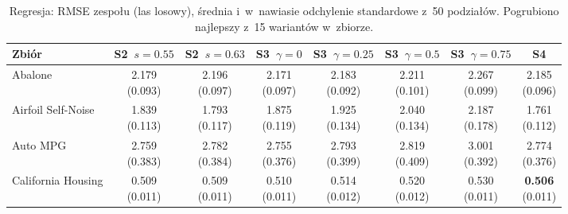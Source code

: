 {\scriptsize\setlength{\tabcolsep}{1.5pt}
\begin{longtable}{lccccccc}
\caption{Regresja: RMSE zespołu (las losowy), średnia i~w~nawiasie odchylenie standardowe z~50 podziałów. Pogrubiono najlepszy z~15 wariantów w~zbiorze.}\\
\toprule
\textbf{Zbiór} & S2~$s=0.55$ & S2~$s=0.63$ & S3~$\gamma=0$ & S3~$\gamma=0.25$ & S3~$\gamma=0.5$ & S3~$\gamma=0.75$ & S4 \\
\midrule
\endhead
Abalone & \makecell{2.179\\{\tiny (0.093)}} & \makecell{2.196\\{\tiny (0.097)}} & \makecell{2.171\\{\tiny (0.097)}} & \makecell{2.183\\{\tiny (0.092)}} & \makecell{2.211\\{\tiny (0.101)}} & \makecell{2.267\\{\tiny (0.099)}} & \makecell{2.185\\{\tiny (0.096)}} \\
Airfoil Self-Noise & \makecell{1.839\\{\tiny (0.113)}} & \makecell{1.793\\{\tiny (0.117)}} & \makecell{1.875\\{\tiny (0.119)}} & \makecell{1.925\\{\tiny (0.134)}} & \makecell{2.040\\{\tiny (0.134)}} & \makecell{2.187\\{\tiny (0.178)}} & \makecell{1.761\\{\tiny (0.112)}} \\
Auto MPG & \makecell{2.759\\{\tiny (0.383)}} & \makecell{2.782\\{\tiny (0.384)}} & \makecell{2.755\\{\tiny (0.376)}} & \makecell{2.793\\{\tiny (0.399)}} & \makecell{2.819\\{\tiny (0.409)}} & \makecell{3.001\\{\tiny (0.392)}} & \makecell{2.774\\{\tiny (0.376)}} \\
California Housing & \makecell{0.509\\{\tiny (0.011)}} & \makecell{0.509\\{\tiny (0.011)}} & \makecell{0.510\\{\tiny (0.011)}} & \makecell{0.514\\{\tiny (0.012)}} & \makecell{0.520\\{\tiny (0.012)}} & \makecell{0.530\\{\tiny (0.011)}} & \makecell{\textbf{0.506}\\{\tiny (0.011)}} \\

\end{longtable}}
